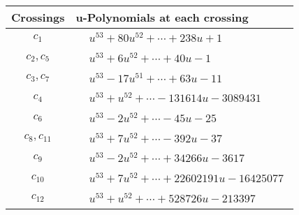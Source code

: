 \documentclass[1p]{elsarticle_modified}
\theoremstyle{definition}
\begin{document}
\begin{tabular}{m{50pt}|m{274pt}}
Crossings & \hspace{64pt}u-Polynomials at each crossing \\
\hline $$\begin{aligned}c_{1}\end{aligned}$$&$\begin{aligned}
&u^{53}+80 u^{52}+\cdots+238 u+1
\end{aligned}$\\
\hline $$\begin{aligned}c_{2},c_{5}\end{aligned}$$&$\begin{aligned}
&u^{53}+6 u^{52}+\cdots+40 u-1
\end{aligned}$\\
\hline $$\begin{aligned}c_{3},c_{7}\end{aligned}$$&$\begin{aligned}
&u^{53}-17 u^{51}+\cdots+63 u-11
\end{aligned}$\\
\hline $$\begin{aligned}c_{4}\end{aligned}$$&$\begin{aligned}
&u^{53}+u^{52}+\cdots-131614 u-3089431
\end{aligned}$\\
\hline $$\begin{aligned}c_{6}\end{aligned}$$&$\begin{aligned}
&u^{53}-2 u^{52}+\cdots-45 u-25
\end{aligned}$\\
\hline $$\begin{aligned}c_{8},c_{11}\end{aligned}$$&$\begin{aligned}
&u^{53}+7 u^{52}+\cdots-392 u-37
\end{aligned}$\\
\hline $$\begin{aligned}c_{9}\end{aligned}$$&$\begin{aligned}
&u^{53}-2 u^{52}+\cdots+34266 u-3617
\end{aligned}$\\
\hline $$\begin{aligned}c_{10}\end{aligned}$$&$\begin{aligned}
&u^{53}+7 u^{52}+\cdots+22602191 u-16425077
\end{aligned}$\\
\hline $$\begin{aligned}c_{12}\end{aligned}$$&$\begin{aligned}
&u^{53}+u^{52}+\cdots+528726 u-213397
\end{aligned}$\\
\hline
\end{tabular}\\~\\
\end{document}
